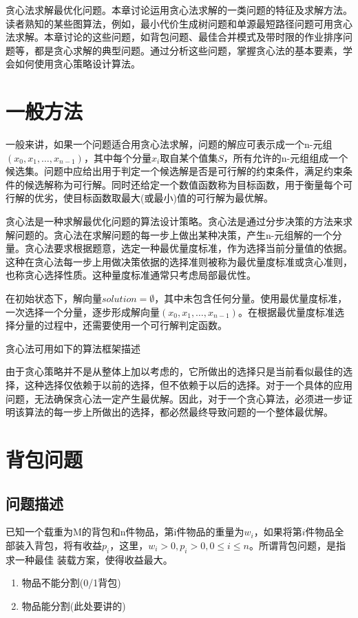 贪心法求解最优化问题。本章讨论运用贪心法求解的一类问题的特征及求解方法。读者熟知的某些图算法，例如，最小代价生成树问题和单源最短路径问题可用贪心法求解。本章讨论的这些问题，如背包问题、最佳合并模式及带时限的作业排序问题等，都是贪心求解的典型问题。通过分析这些问题，掌握贪心法的基本要素，学会如何使用贪心策略设计算法。
\section{一般方法}
一般来讲，如果一个问题适合用贪心法求解，问题的解应可表示成一个n-元组$(x_0,x_1,\dots,x_{n-1})$，其中每个分量$x_i$取自某个值集$S$，所有允许的n-元组组成一个候选集。问题中应给出用于判定一个候选解是否是可行解的约束条件，满足约束条件的候选解称为可行解。同时还给定一个数值函数称为目标函数，用于衡量每个可行解的优劣，使目标函数取最大(或最小)值的可行解为最优解。

贪心法是一种求解最优化问题的算法设计策略。贪心法是通过分步决策的方法来求解问题的。贪心法在求解问题的每一步上做出某种决策，产生n-元组解的一个分量。贪心法要求根据题意，选定一种最优量度标准，作为选择当前分量值的依据。这种在贪心法每一步上用做决策依据的选择准则被称为最优量度标准或贪心准则，也称贪心选择性质。这种量度标准通常只考虑局部最优性。

在初始状态下，解向量$solution=\emptyset$，其中未包含任何分量。使用最优量度标准，一次选择一个分量，逐步形成解向量$(x_0,x_1,\dots,x_{n-1})$。在根据最优量度标准选择分量的过程中，还需要使用一个可行解判定函数。

贪心法可用如下的算法框架描述


由于贪心策略并不是从整体上加以考虑的，它所做出的选择只是当前看似最佳的选择，这种选择仅依赖于以前的选择，但不依赖于以后的选择。对于一个具体的应用问题，无法确保贪心法一定产生最优解。因此，对于一个贪心算法，必须进一步证明该算法的每一步上所做出的选择，都必然最终导致问题的一个整体最优解。
\section{背包问题}
\subsection*{问题描述}
已知一个载重为M的背包和n件物品，第i件物品的重量为$w_i$，如果将第$i$件物品全部装入背包，将有收益$p_i$，这里，$w_i>0,p_i>0,0\leq i\leq n$。所谓背包问题，是指求一种最佳 装载方案，使得收益最大。
\begin{enumerate}
	\item 物品不能分割(0/1背包)
	\item 物品能分割(此处要讲的)
\end{enumerate}

